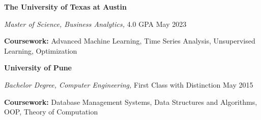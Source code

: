 \textbf{The University of Texas at Austin} \par
\textit{Master of Science, Business Analytics,} 4.0 GPA \hfill May 2023\par
\textbf{Coursework:} Advanced Machine Learning, Time Series Analysis, Unsupervised Learning, Optimization\par
\newline\par

\hfill

\textbf{University of Pune} \par
\textit{Bachelor Degree, Computer Engineering,} First Class with Distinction \hfill May 2015\par
\textbf{Coursework:} Database Management Systems, Data Structures and Algorithms, OOP, Theory of Computation\par